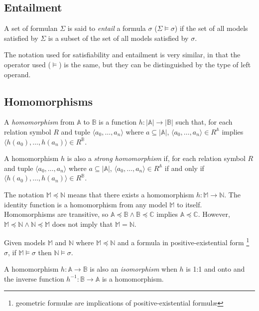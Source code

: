	\subsection{Entailment}

		A set of formulan $\Sigma$ is said to \emph{entail} a formula $\sigma$
		($\Sigma \models \sigma$) if the set of all models satisfied by
		$\Sigma$ is a subset of the set of all models satisfied by $\sigma$.

		The notation used for satisfiability and entailment is very similar, in
		that the operator used ($\models$) is the same, but they can be
		distinguished by the type of left operand.

	\subsection{Homomorphisms}

		A \emph{homomorphism} from $\mathbb{A}$ to $\mathbb{B}$ is a function
		$h: |\mathbb{A}|\to|\mathbb{B}|$ such that, for each relation symbol
		$R$ and tuple $\langle a_0 , \ldots , a_n \rangle$ where $a \subseteq
		|\mathbb{A}|$, $\langle a_0 , \ldots , a_n  \rangle \in R^\mathbb{A}$
		implies $\langle h(a_0) , \ldots , h(a_n) \rangle \in R^\mathbb{B}$.

		A homomorphism $h$ is also a \emph{strong homomorphism} if, for each
		relation symbol $R$ and tuple $\langle a_0 , \ldots , a_n \rangle$
		where $a \subseteq |\mathbb{A}|$, $\langle a_0 , \ldots , a_n  \rangle
		\in R^\mathbb{A}$ if and only if $\langle h(a_0) , \ldots , h(a_n)
		\rangle \in R^\mathbb{B}$.

		The notation $\mathbb{M} \preceq \mathbb{N}$ means that there exists a
		homomorphism $h : \mathbb{M} \to \mathbb{N}$. The identity function is
		a homomorphism from any model $\mathbb{M}$ to itself.  Homomorphisms
		are transitive, so $\mathbb{A} \preceq \mathbb{B} \wedge \mathbb{B}
		\preceq \mathbb{C}$ implies $\mathbb{A} \preceq \mathbb{C}$. However,
		$\mathbb{M} \preceq \mathbb{N} \wedge \mathbb{N} \preceq \mathbb{M}$
		does not imply that $\mathbb{M} = \mathbb{N}$.

		Given models $\mathbb{M}$ and $\mathbb{N}$ where $\mathbb{M} \preceq
		\mathbb{N}$ and a formula in positive-existential form
		\footnote{geometric formul{\ae} are implications of positive-existential
		formul{\ae}} $\sigma$, if $\mathbb{M} \models \sigma$ then $\mathbb{N}
		\models \sigma$.

		A homomorphism $h : \mathbb{A} \to \mathbb{B}$ is also an
		\emph{isomorphism} when $h$ is 1:1 and onto and the inverse function
		$h^{-1} : \mathbb{B} \to \mathbb{A}$ is a homomorphism.

